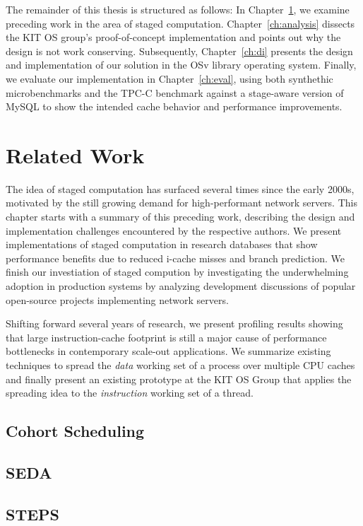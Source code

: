 \documentclass[12pt,a4paper]{book}
\begin{document}
The remainder of this thesis is structured as follows:
In Chapter~\ref{ch:relwork}, we examine preceding work in the area of staged computation.
Chapter~\ref{ch:analysis} dissects the KIT OS group's proof-of-concept implementation and points out why the design is not work conserving.
Subsequently, Chapter~\ref{ch:di} presents the design and implementation of our solution in the OSv library operating system.
Finally, we evaluate our implementation in Chapter~\ref{ch:eval}, using both synthethic microbenchmarks and the TPC-C benchmark against a stage-aware version of MySQL to show the intended cache behavior and performance improvements.

\chapter{Related Work}\label{ch:relwork}
The idea of staged computation has surfaced several times since the early 2000s, motivated by the still growing demand for high-performant network servers.
This chapter starts with a summary of this preceding work, describing the design and implementation challenges encountered by the respective authors.
We present implementations of staged computation in research databases that show performance benefits due to reduced i-cache misses and branch prediction.
We finish our investiation of staged compution by investigating the underwhelming adoption in production systems by analyzing development discussions of popular open-source projects implementing network servers.

Shifting forward several years of research, we present profiling results showing that large instruction-cache footprint is still a major cause of performance bottlenecks in contemporary scale-out applications.
We summarize existing techniques to spread the \emph{data} working set of a process over multiple CPU caches and finally present an existing prototype at the KIT OS Group that applies the spreading idea to the \emph{instruction} working set of a thread.

\section{Cohort Scheduling}
\blindtext

\section{SEDA}
\blindtext

\section{STEPS}
\blindtext
\end{document}
